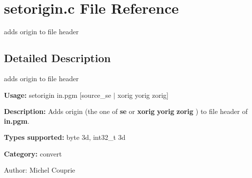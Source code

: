 \section{setorigin.c File Reference}
\label{setorigin_8c}
adds origin to file header  




\label{_details}
\subsection{Detailed Description}
adds origin to file header 

{\bf Usage:} setorigin in.pgm [source\_\-se $|$ xorig yorig zorig]

{\bf Description:} Adds origin (the one of {\bf se} or {\bf xorig} {\bf yorig} {\bf zorig} ) to file header of {\bf in.pgm}.

{\bf Types supported:} byte 3d, int32\_\-t 3d

{\bf Category:} convert

\begin{Desc}
\item[Author:]Michel Couprie \end{Desc}
